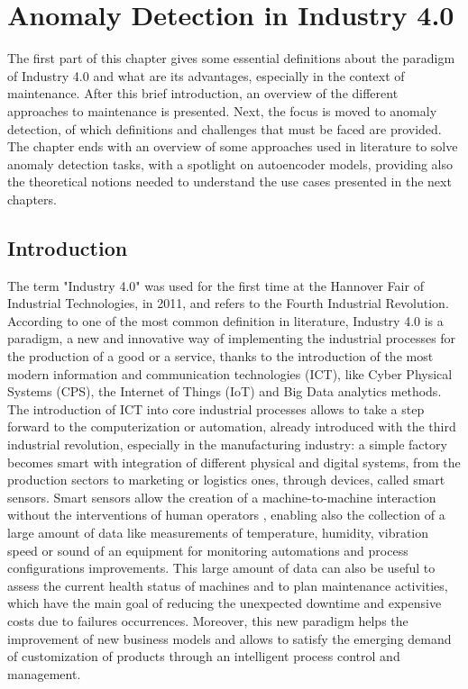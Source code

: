 \chapter{Anomaly Detection in Industry 4.0}


The first part of this chapter gives some essential definitions about the paradigm of Industry 4.0 and what are its advantages, especially in the context of maintenance. After this brief introduction, an overview of the different approaches to maintenance is presented. Next, the focus is moved to anomaly detection, of which definitions and challenges that must be faced are provided. The chapter ends with an overview of some approaches used in literature to solve anomaly detection tasks, with a spotlight on autoencoder models, providing also the theoretical notions needed to understand the use cases presented in the next chapters.

\section{Introduction}
The term "Industry 4.0" was used for the first time at the Hannover Fair of Industrial Technologies, in 2011, and refers to the Fourth Industrial Revolution. According to one of the most common definition in literature, Industry 4.0 is a paradigm, a new and innovative way of implementing the industrial processes for the production of a good or a service, thanks to the introduction of the most modern information and communication technologies (ICT), like Cyber Physical Systems (CPS), the Internet of Things (IoT) and Big Data analytics methods.\\ 
The introduction of ICT into core industrial processes allows to take a step forward to the computerization or automation, already introduced with the third industrial revolution, especially in the manufacturing industry: a simple factory becomes smart with integration of different physical and digital systems, from the production sectors to marketing or logistics ones, through devices, called smart sensors. Smart sensors allow the creation of a machine-to-machine interaction without the interventions of human operators \cite{1smartfactory}, enabling also the collection of a large amount of data like measurements of temperature, humidity, vibration speed or sound of an equipment for monitoring automations and process configurations improvements. This large amount of data can also be useful to assess the current health status of machines and to plan maintenance activities, which have the main goal of reducing the unexpected downtime and expensive costs due to failures occurrences. Moreover, this new paradigm helps the improvement of new business models and allows to satisfy the emerging demand of customization of products through an intelligent process control and management.

